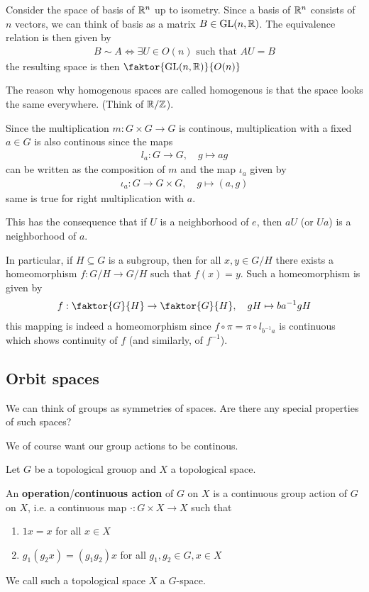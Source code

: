 \begin{ex}[]
  Consider the space of basis of $\mathbb{R}^{n}$ up to isometry.
  Since a basis of $\mathbb{R}^{n}$ consists of $n$ vectors, we can think of basis as a matrix $B \in \operatorname{GL}(n,\mathbb{R})$.
  The equivalence relation is then given by 
 \begin{align*}
  B \sim A \iff \exists U \in O(n) \text{ such that } AU = B
 \end{align*}
 the resulting space is then $\faktor{\GL(n,\R)}{O(n)}$
\end{ex}

\begin{rem}[]
  The reason why homogenous spaces are called homogenous is that the space looks the same everywhere. (Think of $\mathbb{R}/\mathbb{Z}$).

  Since the multiplication $m: G \times G \to G$ is continous, multiplication with a fixed $a \in G$ is also continous since the maps
  \begin{align*}
    l_a: G \to  G, \quad g \mapsto ag
  \end{align*}
  can be written as the composition of $m$ and the map $\iota_a$ given by
  \begin{align*}
    \iota_a: G \to G \times G, \quad g \mapsto  (a,g)
  \end{align*}
  same is true for right multiplication with $a$.

  This has the consequence that if $U$ is a neighborhood of $e$, then $aU$ (or $Ua$) is a neighborhood of $a$.

  In particular, if $H \subseteq G$ is a subgroup, then for all $x,y \in G/H$ there exists a homeomorphism $f: G/H \to G/H$ such that $f(x) = y$.
  Such a homeomorphism is given by
  \begin{align*}
    f: \faktor{G}{H} \to \faktor{G}{H}, \quad gH \mapsto  ba^{-1}gH
  \end{align*}
  this mapping is indeed a homeomorphism since $f \circ \pi = \pi \circ l_{b^{-1}a}$ is continuous which shows continuity of $f$ (and similarly, of $f^{-1}$).
\end{rem}


\subsection{Orbit spaces}
We can think of groups as symmetries of spaces. Are there any special properties of such spaces?


We of course want our group actions to be continous.
\begin{dfn}[]
Let $G$ be a topological grouop and $X$ a topological space.

An \textbf{operation}/\textbf{continuous action} of $G$ on $X$ is a continuous group action of $G$ on $X$, i.e. a continuous map $\cdot: G \times X \to  X$ such that
\begin{enumerate}
  \item $1 x = x$ for all $x \in X$
  \item $g_1(g_2 x) = (g_1 g_2) x$ for all $g_1,g_2 \in G, x \in X$
\end{enumerate}
We call such a topological space $X$ a $G$-space.
\end{dfn}

